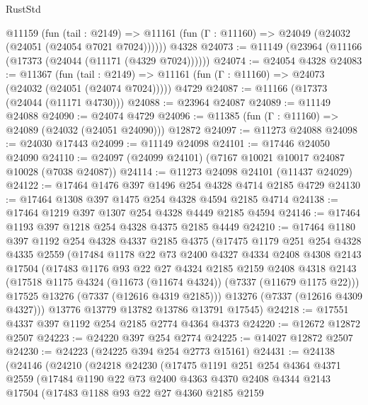 \begin{lexlean}{RustStd}
\begin{coremodule}
    @11159
      (fun (tail : @2149) =>
      @11161 (fun (Γ : @11160) => @24049 (@24032 (@24051 (@24054 @7021 @7024))))))
    @4328
@24073 := @11149 (@23964 (@11166 (@17373 (@24044 (@11171 (@4329 @7024))))))
@24074 := @24054 @4328
@24083 := @11367
    (fun (tail : @2149) => @11161 (fun (Γ : @11160) => @24073 (@24032 (@24051 (@24074 @7024)))))
    @4729
@24087 := @11166 (@17373 (@24044 (@11171 @4730)))
@24088 := @23964 @24087
@24089 := @11149 @24088
@24090 := @24074 @4729
@24096 := @11385 (fun (Γ : @11160) => @24089 (@24032 (@24051 @24090))) @12872
@24097 := @11273 @24088
@24098 := @24030 @17443
@24099 := @11149 @24098
@24101 := @17446 @24050 @24090
@24110 := @24097 (@24099 @24101) (@7167 @10021 @10017 @24087 @10028 (@7038 @24087))
@24114 := @11273 @24098 @24101 (@11437 @24029)
@24122 := @17464 @1476 @397 @1496 @254 @4328 @4714 @2185 @4729
@24130 := @17464 @1308 @397 @1475 @254 @4328 @4594 @2185 @4714
@24138 := @17464 @1219 @397 @1307 @254 @4328 @4449 @2185 @4594
@24146 := @17464 @1193 @397 @1218 @254 @4328 @4375 @2185 @4449
@24210 := @17464
    @1180
    @397
    @1192
    @254
    @4328
    @4337
    @2185
    @4375
    (@17475
      @1179
      @251
      @254
      @4328
      @4335
      @2559
      (@17484
        @1178
        @22
        @73
        @2400
        @4327
        @4334
        @2408
        @4308
        @2143
        @17504
        (@17483
          @1176
          @93
          @22
          @27
          @4324
          @2185
          @2159
          @2408
          @4318
          @2143
          (@17518 @1175 @4324 (@11673 (@11674 @4324)) (@7337 (@11679 @1175 @22)))
          @17525
          @13276
          (@7337 (@12616 @4319 @2185)))
        @13276
        (@7337 (@12616 @4309 @4327)))
      @13776
      @13779
      @13782
      @13786
      @13791
      @17545)
@24218 := @17551 @4337 @397 @1192 @254 @2185 @2774 @4364 @4373
@24220 := @12672 @12872 @2507
@24223 := @24220 @397 @254 @2774
@24225 := @14027 @12872 @2507
@24230 := @24223 (@24225 @394 @254 @2773 @15161)
@24431 := @24138
    (@24146
      (@24210
        (@24218
          @24230
          (@17475
            @1191
            @251
            @254
            @4364
            @4371
            @2559
            (@17484
              @1190
              @22
              @73
              @2400
              @4363
              @4370
              @2408
              @4344
              @2143
              @17504
              (@17483
                @1188
                @93
                @22
                @27
                @4360
                @2185
                @2159

\end{coremodule}
\end{lexlean}
